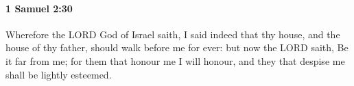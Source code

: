 
		\paragraph{1 Samuel 2:30} %
			\label{1SAMUEL-2-30}

			Wherefore the LORD God of Israel saith, I said indeed that thy house, and the house of thy father, should walk before me for ever: but now the LORD saith, Be it far from me; for them that honour me I will honour, and they that despise me shall be lightly esteemed.


